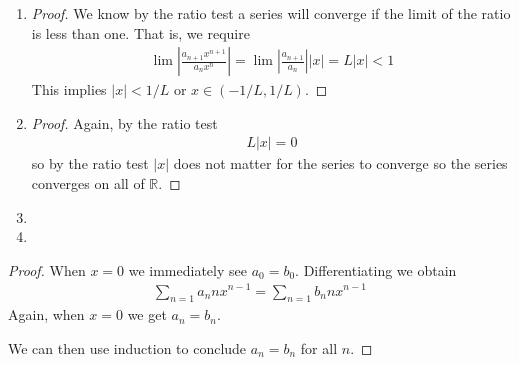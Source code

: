 \begin{enumerate}[label=(\alph*)]
    \item 
    \begin{proof}
        We know by the ratio test a series will converge if the limit of the ratio 
        is less than one. That is, we require 
        \begin{align*}
            \lim |\frac{a_{n+1}x^{n+1}}{a_nx^n}| = \lim |\frac{a_{n+1}}{a_n}||x| = L|x| < 1
        \end{align*}
        This implies $|x|<1/L$ or $x \in (-1/L,1/L)$. 
    \end{proof}

    \item
    \begin{proof}
        Again, by the ratio test
        \begin{align*}
            L|x| = 0
        \end{align*}
        so by the ratio test $|x|$ does not matter for the series to converge so the series 
        converges on all of $\mathbb{R}$.
    \end{proof}

    \item
    
    
    \item

\end{enumerate}

\begin{proof}
    When $x=0$ we immediately see $a_0 = b_0$. Differentiating we obtain
    \begin{align*}
        \sum_{n=1} a_n n x^{n-1} = \sum_{n=1} b_n n x^{n-1}
    \end{align*}
    Again, when $x=0$ we get $a_n=b_n$.

    We can then use induction to conclude $a_n=b_n$ for all $n$.
\end{proof}



